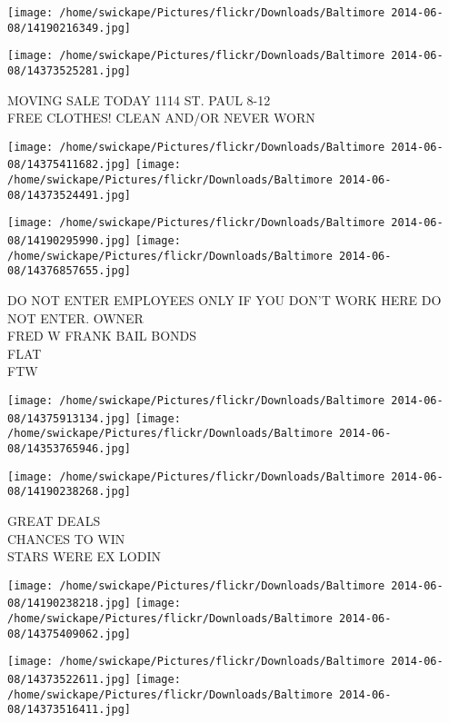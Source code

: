 \documentclass[10pt,letterpaper]{article}
\begin{document}
\texttt{[image: /home/swickape/Pictures/flickr/Downloads/Baltimore 2014-06-08/14190216349.jpg]}

\vspace{0.25in}
\texttt{[image: /home/swickape/Pictures/flickr/Downloads/Baltimore 2014-06-08/14373525281.jpg]}

MOVING SALE TODAY 1114 ST. PAUL 8{-}12\\
FREE CLOTHES! CLEAN AND/OR NEVER WORN\\
\pagebreak

\texttt{[image: /home/swickape/Pictures/flickr/Downloads/Baltimore 2014-06-08/14375411682.jpg]}
\texttt{[image: /home/swickape/Pictures/flickr/Downloads/Baltimore 2014-06-08/14373524491.jpg]}

\texttt{[image: /home/swickape/Pictures/flickr/Downloads/Baltimore 2014-06-08/14190295990.jpg]}
\texttt{[image: /home/swickape/Pictures/flickr/Downloads/Baltimore 2014-06-08/14376857655.jpg]}

DO NOT ENTER EMPLOYEES ONLY IF YOU DON'T WORK HERE DO NOT ENTER.  OWNER\\
FRED W FRANK BAIL BONDS\\
FLAT\\
FTW\\
\pagebreak

\texttt{[image: /home/swickape/Pictures/flickr/Downloads/Baltimore 2014-06-08/14375913134.jpg]}
\texttt{[image: /home/swickape/Pictures/flickr/Downloads/Baltimore 2014-06-08/14353765946.jpg]}

\vspace{0.25in}
\texttt{[image: /home/swickape/Pictures/flickr/Downloads/Baltimore 2014-06-08/14190238268.jpg]}

GREAT DEALS\\
CHANCES TO WIN\\
STARS WERE EX LODIN\\
\pagebreak

\texttt{[image: /home/swickape/Pictures/flickr/Downloads/Baltimore 2014-06-08/14190238218.jpg]}
\texttt{[image: /home/swickape/Pictures/flickr/Downloads/Baltimore 2014-06-08/14375409062.jpg]}

\texttt{[image: /home/swickape/Pictures/flickr/Downloads/Baltimore 2014-06-08/14373522611.jpg]}
\texttt{[image: /home/swickape/Pictures/flickr/Downloads/Baltimore 2014-06-08/14373516411.jpg]}
\end{document}
